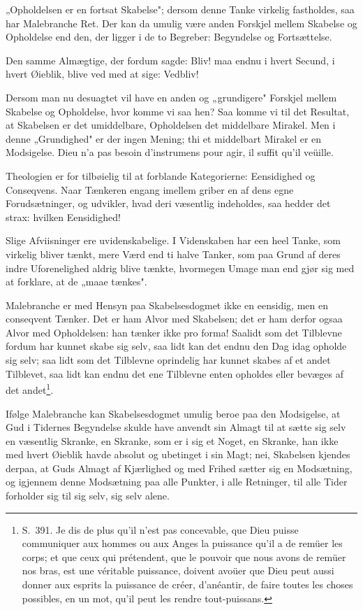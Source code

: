 \documentclass[12pt,a4paper]{article}
\newcommand{\opage}[1]{\marginnote{\footnotesize\textit{[#1]}}}
\begin{document}
„Opholdelsen er en fortsat Skabelse"; dersom denne Tanke virkelig fastholdes, saa
har Malebranche Ret. Der kan da umulig være anden Forskjel mellem Skabelse og
Opholdelse end den, der ligger i de to Begreber: Begyndelse og Fortsættelse.

Den samme Almægtige, der fordum sagde: Bliv! maa endnu i hvert Secund, i hvert
Øieblik, blive ved med at sige: Vedbliv!

Dersom man nu desuagtet vil have en anden og „grundigere" Forskjel mellem
Skabelse og Opholdelse, hvor komme vi saa hen? Saa komme vi til det Resultat, at
Skabelsen er det umiddelbare, Opholdelsen det middelbare Mirakel. Men i denne
„Grundighed" er der ingen Mening; thi et middelbart Mirakel er en Modsigelse.
Dieu n'a pas besoin d'instrumens pour agir, il suffit qu'il veüille.

Theologien er for tilbøielig til at forblande Kategorierne: Eensidighed og
Conseqvens. Naar Tænkeren engang imellem griber en af dens egne Forudsætninger,
og udvikler, hvad deri væsentlig indeholdes, saa hedder det strax: hvilken
Eensidighed!

Slige Afviisninger ere uvidenskabelige. I Videnskaben har een heel Tanke, som
virkelig bliver tænkt, mere Værd end ti halve Tanker, som paa Grund af deres
indre Uforenelighed aldrig blive tænkte, hvormegen Umage man end gjør sig med at
forklare, at de „maae tænkes".

Malebranche er med Hensyn paa Skabelsesdogmet ikke en eensidig, men en conseqvent
Tænker. Det er ham Alvor med Skabelsen; det er ham derfor ogsaa Alvor med
Opholdelsen: han tænker ikke pro forma! Saalidt som det Tilblevne fordum har
kunnet skabe sig selv, saa lidt kan det endnu den Dag idag opholde sig selv; saa
lidt som det Tilblevne oprindelig har kunnet
\opage{29} skabes af et andet Tilblevet, saa lidt kan endnu det ene Tilblevne enten opholdes
eller bevæges af det andet\footnote{S.~391. Je dis de plus qu'il n'est pas
concevable, que Dieu puisse communiquer aux hommes ou aux Anges la puissance
qu'il a de remüer les corps; et que ceux qui prétendent, que le pouvoir que nous
avons de remüer nos bras, est une véritable puissance, doivent avoüer que Dieu
peut aussi donner aux esprits la puissance de créer, d'anéantir, de faire toutes
les choses possibles, en un mot, qu'il peut les rendre tout-puissans.}.

Ifølge Malebranche kan Skabelsesdogmet umulig beroe paa den Modsigelse, at Gud i
Tidernes Begyndelse skulde have anvendt sin Almagt til at sætte sig selv en
væsentlig Skranke, en Skranke, som er i sig et Noget, en Skranke, han ikke med
hvert Øieblik havde absolut og ubetinget i sin Magt; nei, Skabelsen kjendes
derpaa, at Guds Almagt af Kjærlighed og med Frihed sætter sig en Modsætning, og
igjennem denne Modsætning paa alle Punkter, i alle Retninger, til alle Tider
forholder sig til sig selv, sig selv alene.
\end{document}
